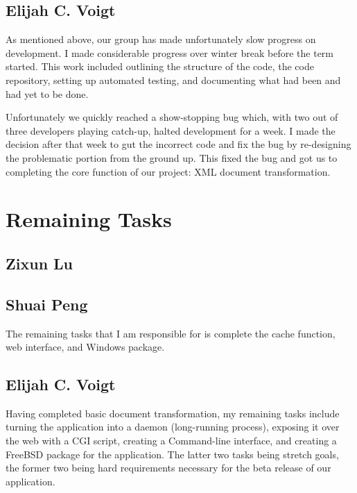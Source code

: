 \subsection{Elijah C. Voigt}

As mentioned above, our group has made unfortunately slow progress on development.
I made considerable progress over winter break before the term started.
This work included outlining the structure of the code, the code repository, setting up automated testing, and documenting what had been and had yet to be done.

Unfortunately we quickly reached a show-stopping bug which, with two out of three developers playing catch-up, halted development for a week.
I made the decision after that week to gut the incorrect code and fix the bug by re-designing the problematic portion from the ground up.
This fixed the bug and got us to completing the core function of our project: XML document transformation.

\section{Remaining Tasks}

\subsection{Zixun Lu}

\subsection{Shuai Peng}

The remaining tasks that I am responsible for is complete the cache function, web interface, and Windows package.

\subsection{Elijah C. Voigt}

Having completed basic document transformation, my remaining tasks include turning the application into a daemon (long-running process), exposing it over the web with a CGI script, creating a Command-line interface, and creating a FreeBSD package for the application.
The latter two tasks being stretch goals, the former two being hard requirements necessary for the beta release of our application.

